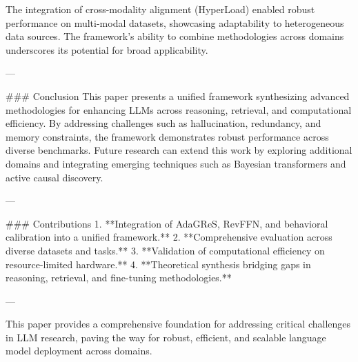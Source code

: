 The integration of cross-modality alignment (HyperLoad) enabled robust performance on multi-modal datasets, showcasing adaptability to heterogeneous data sources. The framework's ability to combine methodologies across domains underscores its potential for broad applicability.

---

### Conclusion  
This paper presents a unified framework synthesizing advanced methodologies for enhancing LLMs across reasoning, retrieval, and computational efficiency. By addressing challenges such as hallucination, redundancy, and memory constraints, the framework demonstrates robust performance across diverse benchmarks. Future research can extend this work by exploring additional domains and integrating emerging techniques such as Bayesian transformers and active causal discovery.

---

### Contributions  
1. **Integration of AdaGReS, RevFFN, and behavioral calibration into a unified framework.**  
2. **Comprehensive evaluation across diverse datasets and tasks.**  
3. **Validation of computational efficiency on resource-limited hardware.**  
4. **Theoretical synthesis bridging gaps in reasoning, retrieval, and fine-tuning methodologies.**

---  

This paper provides a comprehensive foundation for addressing critical challenges in LLM research, paving the way for robust, efficient, and scalable language model deployment across domains.